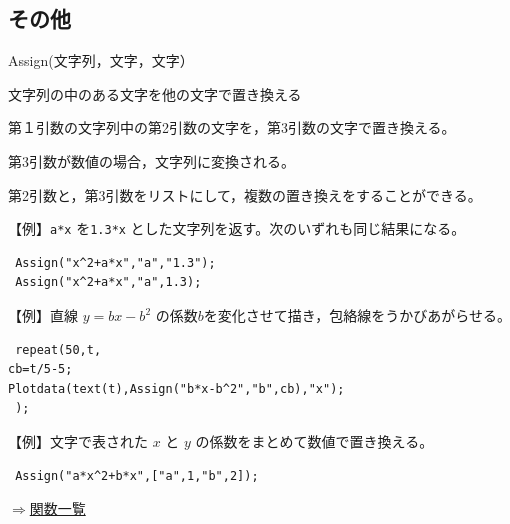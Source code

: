 \documentclass[papersize,a4paper,12pt,uplatex]{jsarticle}
\begin{document}
\subsection{その他}

\begin{description}


\hypertarget{assign}{}
\item[関数]Assign(文字列，文字，文字）
\item[機能]文字列の中のある文字を他の文字で置き換える
\item[説明]第１引数の文字列中の第2引数の文字を，第3引数の文字で置き換える。

第3引数が数値の場合，文字列に変換される。

第2引数と，第3引数をリストにして，複数の置き換えをすることができる。

\vspace{\baselineskip}
【例】\verb|a*x| を\verb|1.3*x| とした文字列を返す。次のいずれも同じ結果になる。
\begin{verbatim}
 Assign("x^2+a*x","a","1.3"); 
 Assign("x^2+a*x","a",1.3);
\end{verbatim}

\vspace{\baselineskip}
【例】直線 $y=bx-b^2$ の係数$b$を変化させて描き，包絡線をうかびあがらせる。
\begin{verbatim}
 repeat(50,t,
cb=t/5-5;
Plotdata(text(t),Assign("b*x-b^2","b",cb),"x");
 );
\end{verbatim}
\begin{center}  \end{center}
\vspace{\baselineskip}
【例】文字で表された $x$ と $y$ の係数をまとめて数値で置き換える。
\begin{verbatim} 
 Assign("a*x^2+b*x",["a",1,"b",2]);
\end{verbatim}

\begin{flushright}\hyperlink{functionlist}{$\Rightarrow$関数一覧}\end{flushright}



\end{description}
\end{document}
